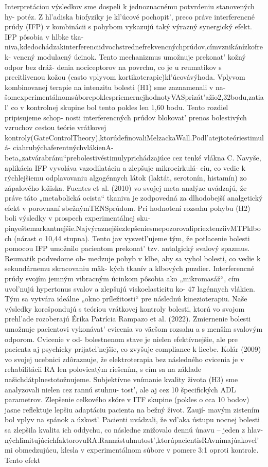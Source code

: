 Interpretáciou výsledkov sme dospeli k jednoznacnému potvrdeniu stanovených hy- potéz. Z hl’adiska biofyziky je kl’úcové pochopit’, preco práve interferencné prúdy (IFP) v kombinácii s pohybom vykazujú taký výrazný synergický efekt. IFP pôsobia v hlbke tka- niva,kdedochádzakinterferenciidvochstrednefrekvencnýchprúdov,címvznikánízkofrek- vencný modulacný úcinok. Tento mechanizmus umožnuje prekonat’ kožný odpor bez dráž- denia nociceptorov na povrchu, co je u reumatikov s precitlivenou kožou (casto vplyvom kortikoterapie)kl’úcovávýhoda. Vplyvom kombinovanej terapie na intenzitu bolesti (H1) sme zaznamenali v na- šomexperimentálnomsúborepoklespriemernejhodnotyVASprizát’ažio2,32bodu,zatial’ co v kontrolnej skupine bol tento pokles len 1,60 bodu. Tento rozdiel pripisujeme schop- nosti interferencných prúdov blokovat’ prenos bolestivých vzruchov cestou teórie vrátkovej kontroly(GateControlTheory),ktorúdefinovaliMelzackaWall.Podl’atejtoteóriestimulá- ciahrubýchaferentnýchvlákienA-beta„zatvárabránu“prebolestivéstimulyprichádzajúce cez tenké vlákna C. Navyše, aplikácia IFP vyvoláva vazodilatáciu a zlepšuje mikrocirkulá- ciu, co vedie k rýchlejšiemu odplavovaniu algogénnych látok (laktát, serotonín, histamín) zo zápalového ložiska. Fuentes et al. (2010) vo svojej meta-analýze uvádzajú, že práve táto „metabolická ocista“ tkaniva je zodpovedná za dlhodobejší analgetický efekt v porovnaní sbežnýmTENSprúdom. Pri hodnotení rozsahu pohybu (H2) boli výsledky v prospech experimentálnej sku- pinyeštemarkantnejšie.NajvýraznejšiezlepšeniesmepozorovalipriextenziivMTPklboch (nárast o 10,44 stupna). Tento jav vysvetl’ujeme tým, že potlacenie bolesti pomocou IFP umožnilo pacientom prekonat’ tzv. antalgický svalový spazmus. Reumatik podvedome ob- medzuje pohyb v klbe, aby sa vyhol bolesti, co vedie k sekundárnemu skracovaniu mäk- kých tkanív a klbových puzdier. Interferencné prúdy svojím jemným vibracným úcinkom pôsobia ako „mikromasáž“, cím uvol’nujú hypertonus svalov a zlepšujú viskoelasticitu ko- 47 lagénnych vlákien. Tým sa vytvára ideálne „okno príležitosti“ pre následnú kinezioterapiu. Naše výsledky korešpondujú s teóriou vrátkovej kontroly bolesti, ktorú vo svojom prehl’ade rozoberajú Érika Patrícia Rampazo et al. (2022). Zmiernenie bolesti umožnuje pacientovi vykonávat’ cvicenia vo väcšom rozsahu a s menším svalovým odporom. Cvicenie v od- bolestnenom stave je nielen efektívnejšie, ale pre pacienta aj psychicky prijatel’nejšie, co zvyšuje compliance k liecbe. Kolár (2009) vo svojej ucebnici zdôraznuje, že elektroterapia bez následného cvicenia je v rehabilitácii RA len polovicatým riešením, s cím sa na základe našichdátplnestotožnujeme. Subjektívne vnímanie kvality života (H3) sme analyzovali nielen cez rannú stuhnu- tost’, ale aj cez 10 špecifických ADL parametrov. Zlepšenie celkového skóre v ITF skupine (pokles o cca 10 bodov) jasne reflektuje lepšiu adaptáciu pacienta na bežný život. Zaují- mavým zistením bol vplyv na spánok a úzkost’. Pacienti uvádzali, že vd’aka ústupu nocnej bolesti sa zlepšila kvalita ich oddychu, co následne znižovalo dennú únavu -- jeden z hlav- nýchlimitujúcichfaktorovuRA.Rannástuhnutost’,ktorúpacientisRAvnímajúakovel’mi obmedzujúcu, klesla v experimentálnom súbore v pomere 3:1 oproti kontrole. Tento efekt 